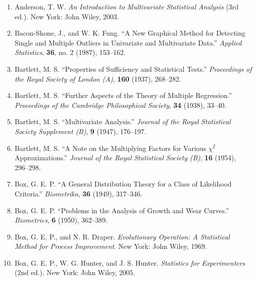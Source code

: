 \begin{enumerate}[leftmargin=2em,itemsep=2pt]
\item Anderson, T. W. \textit{An Introduction to Multivariate Statistical Analysis} (3rd ed.). New York: John Wiley, 2003.
\item Bacon-Shone, J., and W. K. Fung. “A New Graphical Method for Detecting Single and Multiple Outliers in Univariate and Multivariate Data.” \textit{Applied Statistics}, \textbf{36}, no. 2 (1987), 153--162.
\item Bartlett, M. S. “Properties of Sufficiency and Statistical Tests.” \textit{Proceedings of the Royal Society of London (A)}, \textbf{160} (1937), 268--282.
\item Bartlett, M. S. “Further Aspects of the Theory of Multiple Regression.” \textit{Proceedings of the Cambridge Philosophical Society}, \textbf{34} (1938), 33--40.
\item Bartlett, M. S. “Multivariate Analysis.” \textit{Journal of the Royal Statistical Society Supplement (B)}, \textbf{9} (1947), 176--197.
\item Bartlett, M. S. “A Note on the Multiplying Factors for Various $\chi^2$ Approximations.” \textit{Journal of the Royal Statistical Society (B)}, \textbf{16} (1954), 296--298.
\item Box, G. E. P. “A General Distribution Theory for a Class of Likelihood Criteria.” \textit{Biometrika}, \textbf{36} (1949), 317--346.
\item Box, G. E. P. “Problems in the Analysis of Growth and Wear Curves.” \textit{Biometrics}, \textbf{6} (1950), 362--389.
\item Box, G. E. P., and N. R. Draper. \textit{Evolutionary Operation: A Statistical Method for Process Improvement}. New York: John Wiley, 1969.
\item Box, G. E. P., W. G. Hunter, and J. S. Hunter. \textit{Statistics for Experimenters} (2nd ed.). New York: John Wiley, 2005.
\end{enumerate}
